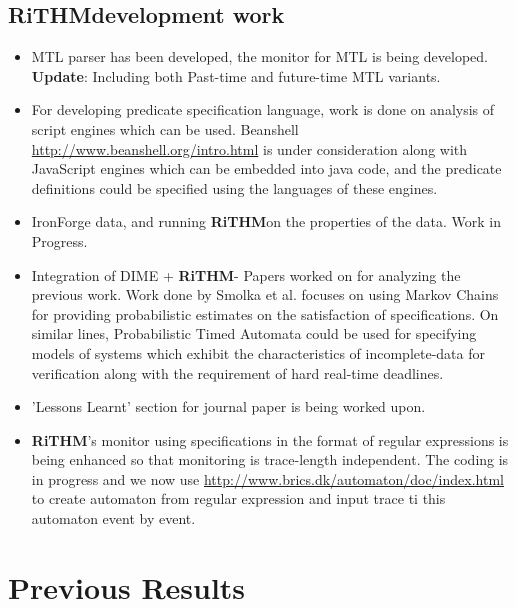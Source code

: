 \documentclass[]{article}
\newcommand{\rithm}{\textbf{RiTHM}\space}
\begin{document}
	\subsection{\rithm development work}
	\begin{itemize}
	\item MTL parser has been developed, the monitor for MTL is being developed. \textbf{Update}: Including both Past-time and future-time MTL variants. 
	\item For developing predicate specification language, work is done on analysis of script engines which can be used. Beanshell \url{http://www.beanshell.org/intro.html} is under consideration along with JavaScript engines which can be embedded into java code, and the predicate definitions could be specified using the languages of these engines.
	
	\item IronForge data, and running \rithm on the properties of the data. Work in Progress.
	
	\item Integration of DIME + \rithm - Papers worked on for analyzing the previous work. Work done by Smolka et al. focuses on using Markov Chains for providing probabilistic estimates on the satisfaction of specifications. On similar lines, Probabilistic Timed Automata could be used for specifying 
	models of systems which exhibit the characteristics of incomplete-data for verification along with the requirement of hard real-time deadlines.
	\item 'Lessons Learnt' section for journal paper is being worked upon.
	
	\item \rithm's monitor using specifications in the format of regular expressions is being enhanced so that monitoring is trace-length independent. The coding is in progress and we now use \url{http://www.brics.dk/automaton/doc/index.html} to create automaton from regular expression and input trace ti this automaton event by event. 
	

	

	\end{itemize}
	
\section{Previous Results}
\end{document}
